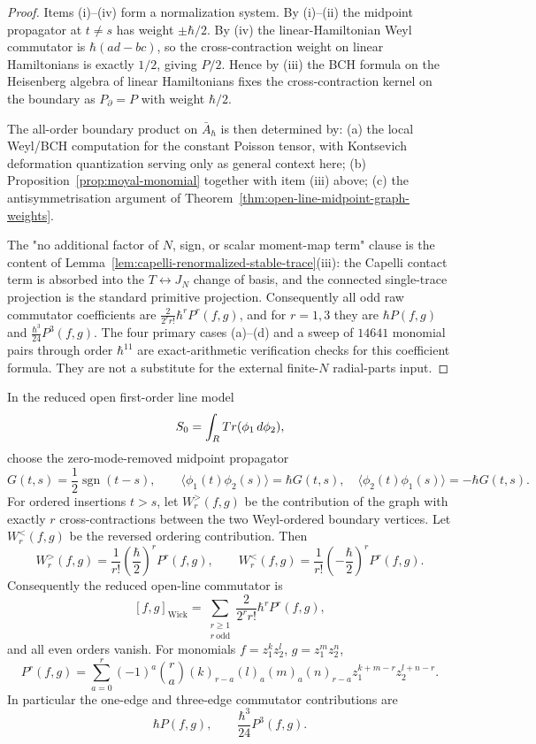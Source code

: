 \documentclass[11pt]{memoir}
\begin{document}
\begin{proof}
  Items (i)--(iv) form a normalization system. By (i)--(ii) the midpoint
  propagator at $t\neq s$ has weight $\pm\hbar/2$. By (iv) the
  linear-Hamiltonian Weyl commutator is $\hbar(ad-bc)$, so the
  cross-contraction weight on linear Hamiltonians is exactly $1/2$, giving
  $P/2$. Hence by (iii) the BCH formula on the Heisenberg algebra of linear
  Hamiltonians fixes the cross-contraction kernel on the boundary as
  $P_{\partial}=P$ with weight $\hbar/2$.

  The all-order boundary product on $\bar A_\hbar$ is then determined by:
  (a) the local Weyl/BCH computation for the constant Poisson tensor,
  with Kontsevich deformation quantization \cite{kontsevich-dq} serving
  only as general context here;
  (b) Proposition~\ref{prop:moyal-monomial} together with item (iii) above;
  (c) the antisymmetrisation argument of
	  Theorem~\ref{thm:open-line-midpoint-graph-weights}.

  The "no additional factor of $N$, sign, or scalar moment-map term" clause
  is the content of
  Lemma~\ref{lem:capelli-renormalized-stable-trace}(iii): the Capelli
  contact term is absorbed into the $T\leftrightarrow J_N$ change of basis,
	  and the connected single-trace projection is the standard primitive
	  projection. Consequently all odd raw commutator coefficients are
  $\frac{2}{2^r r!}\hbar^r P^r(f,g)$, and for $r=1,3$ they are
  $\hbar P(f,g)$ and $\frac{\hbar^3}{24}P^3(f,g)$. The four primary cases
  (a)--(d) and a sweep of \(14641\) monomial pairs through order
  \(\hbar^{11}\) are exact-arithmetic verification checks for this
  coefficient formula. They are not a substitute for the external
  finite-\(N\) radial-parts input.
\end{proof}

\begin{thm}\label{thm:open-line-midpoint-graph-weights}
  In the reduced open first-order line model
  $$S_0=\int_{R}Tr(\phi_1\,d\phi_2),$$
  choose the zero-mode-removed midpoint propagator
  $$G(t,s)=\frac12\operatorname{sgn}(t-s),\qquad
    \langle\phi_1(t)\phi_2(s)\rangle=\hbar G(t,s),\quad
    \langle\phi_2(t)\phi_1(s)\rangle=-\hbar G(t,s).$$
  For ordered insertions \(t>s\), let \(W_r^>(f,g)\) be the contribution
  of the graph with exactly \(r\) cross-contractions between the two
  Weyl-ordered boundary vertices.  Let \(W_r^<(f,g)\) be the reversed
  ordering contribution.  Then
  \[
    W_r^>(f,g)=\frac1{r!}\left(\frac{\hbar}{2}\right)^rP^r(f,g),
    \qquad
    W_r^<(f,g)=\frac1{r!}\left(-\frac{\hbar}{2}\right)^rP^r(f,g).
  \]
  Consequently the reduced open-line commutator is
  \[
    [f,g]_{\mathrm{Wick}}
      =
      \sum_{\substack{r\geq1\\ r\ \mathrm{odd}}}
      \frac{2}{2^r r!}\hbar^rP^r(f,g),
  \]
  and all even orders vanish.  For monomials
  \(f=z_1^kz_2^l\), \(g=z_1^mz_2^n\),
  \[
    P^r(f,g)=
    \sum_{a=0}^r(-1)^a\binom ra
    (k)_{r-a}(l)_a(m)_a(n)_{r-a}
    z_1^{k+m-r}z_2^{l+n-r}.
  \]
  In particular the one-edge and three-edge commutator contributions are
  \[
    \hbar P(f,g),\qquad \frac{\hbar^3}{24}P^3(f,g).
  \]
\end{thm}
\end{document}
